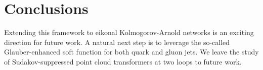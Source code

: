 \section{Conclusions}\label{sec:conclusions}

Extending this framework to eikonal Kolmogorov-Arnold networks is an
exciting direction for future work. A natural next step is to leverage
the so-called Glauber-enhanced soft function for both quark and gluon
jets. We leave the study of Sudakov-suppressed point cloud transformers
at two loops to future work.

